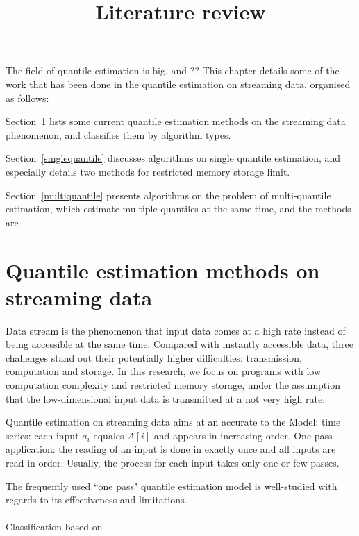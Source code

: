 \documentclass[12pt]{article}
\title{Literature review}
\date{\vspace{-5ex}}
\begin{document}
\maketitle

The field of quantile estimation is big, and ??
This chapter details some of the work that has been done in the quantile estimation on streaming data, organised as follows:

Section~\ref{streamingdata} lists some current quantile estimation methods on the streaming data phenomenon, and classifies them by algorithm types. 

Section~\ref{singlequantile} discusses algorithms on single quantile estimation, and especially details two methods for restricted memory storage limit.

Section~\ref{multiquantile} presents algorithms on the problem of multi-quantile estimation, which estimate multiple quantiles at the same time, and the methods are 

   \section{Quantile estimation methods on streaming data}
   \label{streamingdata}
   Data stream is the phenomenon that input data comes at a high rate instead of being accessible at the same time. Compared with instantly accessible data, three challenges stand out their potentially higher difficulties: transmission, computation and storage\cite{muthukrishnanDataStreamsAlgorithms2005}. 
   In this research, we focus on programs with low computation complexity and restricted memory storage, under the assumption that the low-dimensional input data is transmitted at a not very high rate.
   
   Quantile estimation on streaming data aims at an accurate to the 
   Model: time series: each input $a_i$ equales $A[i]$ and appears in increasing order.
   One-pass application: the reading of an input is done in exactly once and all inputs are read in order. Usually, the process for each input takes only one or few passes. 

   The frequently used ``one pass" quantile estimation model is well-studied with regards to its effectiveness and limitations.
    \\\\
    Classification based on \cite{buragohainQuantilesStreams2009}
\end{document}
